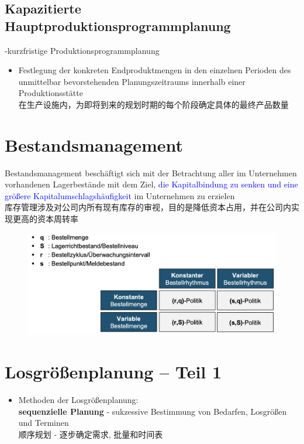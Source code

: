 \documentclass[12pt, letterpaper]{article}
\begin{document}
\begin{CJK*}{UTF8}{gbsn}
\subsection{Kapazitierte Hauptproduktionsprogrammplanung}
-kurzfristige Produktionsprogrammplanung\\[1mm]
\begin{itemize}
\item Festlegung der konkreten Endproduktmengen in den einzelnen Perioden des unmittelbar bevorstehenden Planungszeitraums innerhalb einer Produktionsstätte\\[1mm]
在生产设施内，为即将到来的规划时期的每个阶段确定具体的最终产品数量
\end{itemize}


\newpage
\section{Bestandsmanagement}
Bestandsmanagement beschäftigt sich mit der Betrachtung aller im Unternehmen vorhandenen Lagerbestände mit dem Ziel, \textcolor{blue}{die Kapitalbindung zu senken und eine größere Kapitalumschlagshäufigkeit} im Unternehmen zu erzielen\\[1mm]
库存管理涉及对公司内所有现有库存的审视，目的是降低资本占用，并在公司内实现更高的资本周转率\\

\begin{figure}[h!]
  \centering %
  \includegraphics[width=0.8\linewidth]{VL71.png}
\end{figure}

\newpage
\section{Losgrößenplanung – Teil 1}
\begin{itemize}
\item Methoden der Losgrößenplanung:\\[1mm]
\textbf{sequenzielle Planung} - sukzessive Bestimmung von Bedarfen, Losgrößen und Terminen\\
顺序规划 - 逐步确定需求, 批量和时间表


\end{itemize}
\end{CJK*}
\end{document}
